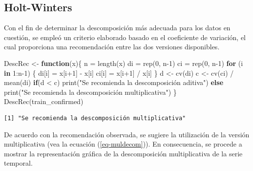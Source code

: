 \documentclass[
  us-letterpaper,
]{scrreprt}
\newenvironment{Shaded}{\begin{snugshade}}{\end{snugshade}}
\newcommand{\ControlFlowTok}[1]{\textcolor[rgb]{0.00,0.23,0.31}{\textbf{#1}}}
\newcommand{\DecValTok}[1]{\textcolor[rgb]{0.68,0.00,0.00}{#1}}
\newcommand{\FunctionTok}[1]{\textcolor[rgb]{0.28,0.35,0.67}{#1}}
\newcommand{\NormalTok}[1]{\textcolor[rgb]{0.00,0.23,0.31}{#1}}
\newcommand{\OtherTok}[1]{\textcolor[rgb]{0.00,0.23,0.31}{#1}}
\newcommand{\SpecialCharTok}[1]{\textcolor[rgb]{0.37,0.37,0.37}{#1}}
\newcommand{\StringTok}[1]{\textcolor[rgb]{0.13,0.47,0.30}{#1}}
\theoremstyle{plain}
\theoremstyle{definition}
\theoremstyle{definition}
\theoremstyle{plain}
\theoremstyle{remark}
\begin{document}
\subsection{Holt-Winters}\label{sec-holt-winters}

Con el fin de determinar la descomposición más adecuada para los datos
en cuestión, se empleó un criterio elaborado basado en el coeficiente de
variación, el cual proporciona una recomendación entre las dos versiones
disponibles.

\begin{Shaded}
\begin{Highlighting}[]
\NormalTok{DescRec }\OtherTok{\textless{}{-}} \ControlFlowTok{function}\NormalTok{(x)\{}
\NormalTok{  n }\OtherTok{=} \FunctionTok{length}\NormalTok{(x)}
\NormalTok{  di }\OtherTok{=} \FunctionTok{rep}\NormalTok{(}\DecValTok{0}\NormalTok{, n}\DecValTok{{-}1}\NormalTok{)}
\NormalTok{  ci }\OtherTok{=} \FunctionTok{rep}\NormalTok{(}\DecValTok{0}\NormalTok{, n}\DecValTok{{-}1}\NormalTok{)}
  \ControlFlowTok{for}\NormalTok{ (i }\ControlFlowTok{in} \DecValTok{1}\SpecialCharTok{:}\NormalTok{n}\DecValTok{{-}1}\NormalTok{) \{}
\NormalTok{    di[i] }\OtherTok{=}\NormalTok{ x[i}\SpecialCharTok{+}\DecValTok{1}\NormalTok{] }\SpecialCharTok{{-}}\NormalTok{ x[i]}
\NormalTok{    ci[i] }\OtherTok{=}\NormalTok{ x[i}\SpecialCharTok{+}\DecValTok{1}\NormalTok{] }\SpecialCharTok{/}\NormalTok{ x[i]}
\NormalTok{  \}}
\NormalTok{  d }\OtherTok{\textless{}{-}} \FunctionTok{cv}\NormalTok{(di) }
\NormalTok{  c }\OtherTok{\textless{}{-}} \FunctionTok{cv}\NormalTok{(ci) }\SpecialCharTok{/} \FunctionTok{mean}\NormalTok{(di)}
  \ControlFlowTok{if}\NormalTok{(d }\SpecialCharTok{\textless{}}\NormalTok{ c)}
    \FunctionTok{print}\NormalTok{(}\StringTok{"Se recomienda la descomposición aditiva"}\NormalTok{)}
  \ControlFlowTok{else}
    \FunctionTok{print}\NormalTok{(}\StringTok{"Se recomienda la descomposición multiplicativa"}\NormalTok{)}
\NormalTok{\}}
\FunctionTok{DescRec}\NormalTok{(train\_confirmed)}
\end{Highlighting}
\end{Shaded}

\begin{verbatim}
[1] "Se recomienda la descomposición multiplicativa"
\end{verbatim}

De acuerdo con la recomendación observada, se sugiere la utilización de
la versión multiplicativa (vea la ecuación (\ref{eq-muldecom})). En
consecuencia, se procede a mostrar la representación gráfica de la
descomposición multiplicativa de la serie temporal.
\end{document}
